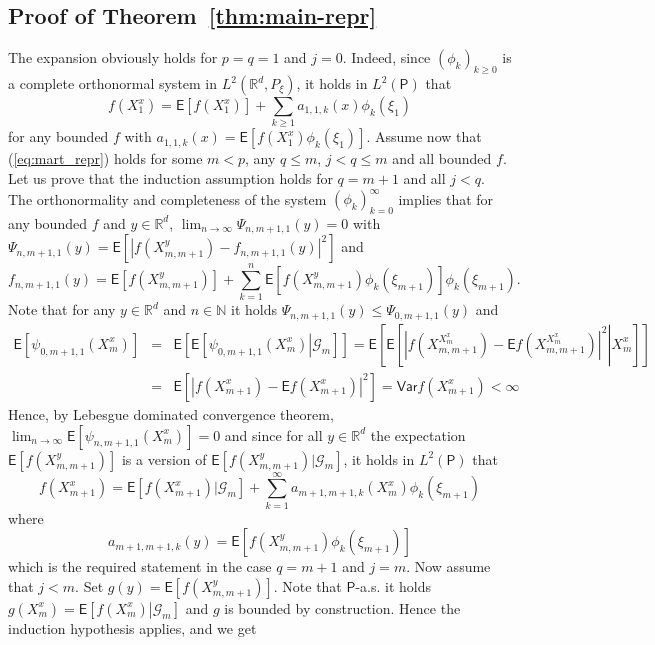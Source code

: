 \documentclass[bj]{imsart}
\def\PE{\mathsf{E}}
\def\PVar{\mathsf{Var}}
\def\nset{\mathbb{N}}
\def\rset{\mathbb{R}}
\def\rset{\mathbb{R}}
\begin{document}
\subsection{Proof of Theorem~\ref{thm:main-repr}}
The expansion obviously holds for $p = q=1$ and $j=0$.
Indeed, since $\left(\phi_{k}\right)_{k \geq 0}$ is a complete orthonormal system in \(L^2(\mathbb{R}^d, P_{\xi})\), it holds in \(L^2(\mathsf{P})\) that
\[
f(X^x_{1})=\PE[f(X^x_{1})]+\sum_{k\geq1}a_{1,1,k}(x)\phi_{k}(\xi_{1})
\]
for any bounded $f$ with $a_{1,1,k}(x)=\PE[f(X_{1}^x)\phi_{k}(\xi_{1})]$.
Assume now that (\ref{eq:mart_repr}) holds for some $m < p$, any $q \leq m$, $j < q \leq m$ and all bounded $f$. Let us prove that the induction assumption holds for $q=m+1$ and all $j < q$.
The orthonormality and completeness
of the system $\left(\phi_{k}\right)_{k=0}^\infty$ implies that for any bounded $f$ and $y \in \rset^d$, 
$\lim_{n \rightarrow \infty}\Psi_{n,m+1,1}(y)= 0$ with $\Psi_{n,m+1,1}(y)= \PE[|f(X^y_{m,m+1}) - f_{n,m+1,1}(y)|^2]$ and
\[
f_{n,m+1,1}(y) = \PE[f(X^y_{m,m+1})] +  \sum\limits_{k=1}^{n}\PE[f(X^y_{m,m+1})\phi_{k}(\xi_{m+1})]\phi_k(\xi_{m+1}).
\]
Note that  for any $y \in \rset^d$ and $n \in \nset$ it holds $\Psi_{n,m+1,1}(y) \leq \Psi_{0,m+1,1}(y)$ and
\begin{eqnarray*}
\PE \left[ \psi_{0,m+1,1}(X_m^x) \right] &=& \PE \left[ \left. \PE \left[ \psi_{0,m+1,1}(X_m^x) \right| \mathcal{G}_m\right]\right] = \PE \left[ \left. \PE \left[ |f(X^{X_m^x}_{m,m+1}) - \PE f(X^{X_m^x}_{m,m+1})|^2 \right| X_m^x\right]\right]
\\
&=& \PE \left[ |f(X_{m+1}^x) - \PE f(X_{m+1}^x)|^2 \right] = \PVar{f(X_{m+1}^x)} < \infty
\end{eqnarray*}
Hence, by Lebesgue dominated convergence theorem, $\lim_{n \rightarrow \infty}\PE \left[\psi_{n,m+1,1}(X_m^x)\right] = 0$ and since for all $y \in \rset^d$ the expectation $\PE[f(X^y_{m,m+1})]$ is a version of $\PE \left[f(X^y_{m,m+1}) | \mathcal{G}_m \right]$, it holds in \(L^2(\mathsf{P})\) that
\begin{equation}
\label{eq:1-step-decomp}
f(X^x_{m+1}) = \PE[f(X^x_{m+1})|\mathcal{G}_m] + \sum\limits_{k=1}^{\infty}a_{m+1,m+1,k}(X^x_{m})\phi_{k}(\xi_{m+1})
\end{equation}
where
\[
a_{m+1,m+1,k}(y) = \PE \left[f(X^y_{m,m+1})\phi_k\left(\xi_{m+1}\right)\right]
\]
which is the required statement in the case $q = m+1$ and $j=m$.
Now assume that $j<m$.
Set $g(y) = \PE \left[f(X_{m,m+1}^y)\right]$. Note that $\mathsf{P}$-a.s. it holds $g(X_m^x) = \PE\left[\left.f(X_m^x) \right| \mathcal{G}_m\right]$ and $g$ is bounded by construction. Hence the induction hypothesis applies, and we get
\end{document}
